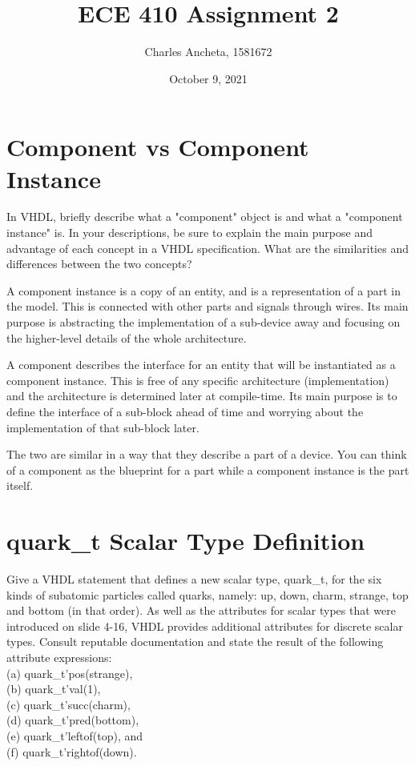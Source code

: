 \documentclass{article}
\title{ECE 410 Assignment 2}
\date{October 9, 2021}
\author{Charles Ancheta, 1581672}
\begin{document}
\maketitle

\section{Component vs Component Instance}

\begin{displayquote}
In VHDL, briefly describe what a "component" object is and what a "component instance" is. In your descriptions, be sure to explain the main purpose and advantage of each concept in a VHDL specification. What are the similarities and differences between the two concepts?
\end{displayquote}

A component instance is a copy of an entity, and is a representation of a part in the model. This is connected with other parts and signals through wires. Its main purpose is abstracting the implementation of a sub-device away and focusing on the higher-level details of the whole architecture.

A component describes the interface for an entity that will be instantiated as a component instance. This is free of any specific architecture (implementation) and the architecture is determined later at compile-time. Its main purpose is to define the interface of a sub-block ahead of time and worrying about the implementation of that sub-block later.

The two are similar in a way that they describe a part of a device. You can think of a component as the blueprint for a part while a component instance is the part itself.

\section{quark\_t Scalar Type Definition}

\begin{displayquote}
Give a VHDL statement that defines a new scalar type, quark\_t, for the six kinds of subatomic particles called quarks, namely: up, down, charm, strange, top and bottom (in that order). As well as the attributes for scalar types that were introduced on slide 4-16, VHDL provides additional attributes for discrete scalar types. Consult reputable documentation and state the result of the following attribute expressions: \\
(a) quark\_t'pos(strange), \\
(b) quark\_t'val(1), \\
(c) quark\_t'succ(charm),  \\
(d) quark\_t'pred(bottom),  \\
(e) quark\_t'leftof(top), and  \\
(f) quark\_t'rightof(down).
\end{displayquote}
\end{document}
